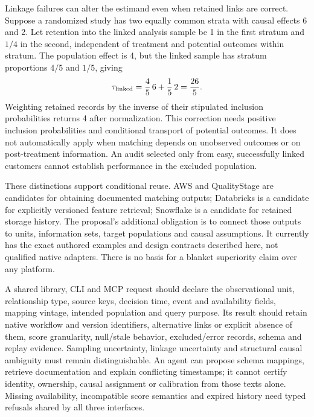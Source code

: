 Linkage failures can alter the estimand even when retained links are correct.
Suppose a randomized study has two equally common strata with causal effects 6
and 2. Let retention into the linked analysis sample be 1 in the first stratum
and $1/4$ in the second, independent of treatment and potential outcomes within
stratum. The population effect is 4, but the linked sample has stratum proportions
$4/5$ and $1/5$, giving
\begin{equation}
 \tau_{\rm linked}=\frac45\,6+\frac15\,2=\frac{26}{5}.
 \label{exec22:obs-inclusion}
\end{equation}
Weighting retained records by the inverse of their stipulated inclusion
probabilities returns 4 after normalization. This correction needs positive
inclusion probabilities and conditional transport of potential outcomes. It does
not automatically apply when matching depends on unobserved outcomes or on
post-treatment information. An audit selected only from easy, successfully linked
customers cannot establish performance in the excluded population.
\cite{exec22_obs_reference}

These distinctions support conditional reuse. AWS and QualityStage are candidates
for obtaining documented matching outputs; Databricks is a candidate for explicitly
versioned feature retrieval; Snowflake is a candidate for retained storage history.
The proposal's additional obligation is to connect those outputs to units,
information sets, target populations and causal assumptions. It currently has the
exact authored examples and design contracts described here, not qualified native
adapters. There is no basis for a blanket superiority claim over any platform.

A shared library, CLI and MCP request should declare the observational unit,
relationship type, source keys, decision time, event and availability fields,
mapping vintage, intended population and query purpose. Its result should retain
native workflow and version identifiers, alternative links or explicit absence of
them, score granularity, null/stale behavior, excluded/error records, schema and
replay evidence. Sampling uncertainty, linkage uncertainty and structural causal
ambiguity must remain distinguishable. An agent can propose schema mappings,
retrieve documentation and explain conflicting timestamps; it cannot certify
identity, ownership, causal assignment or calibration from those texts alone.
Missing availability, incompatible score semantics and expired history need typed
refusals shared by all three interfaces.

